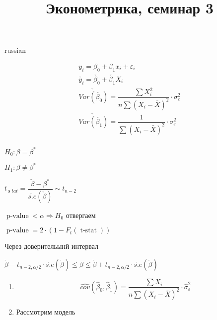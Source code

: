 \documentclass{article}
\begin{document}
\title{\foreignlanguage{russian}{Эконометрика, семинар 3}}
\maketitle
\begin{otherlanguage*}{russian}

\begin{align*}
y_i = \beta_0 + \beta_1 x_i  + \varepsilon_i \\ 
\check{y_i} = \check{\beta_0} + \check{\beta_1} X_i \\
\check{Var(\check{\beta_0})} = \dfrac{\sum X_i^2}{n \sum (X_i - \bar{X})^2} \cdot \sigma^2_{\varepsilon} \\ 
\check{Var(\check{\beta_1})} = \dfrac{1}{\sum (X_i - \bar{X})^2} \cdot \sigma^2_{\varepsilon} \\ 
\end{align*}

$ H_0: \beta = \beta^ * $ 

$ H_1: \beta \ne \beta^* $

$ t_{\operatorname stat} = \dfrac{\check{\beta} - \beta^*}{\check{s.e} (\check{\beta})} \sim t_{n-2} $

$ \operatorname{p-value} < \alpha \Rightarrow H_0 $ отвергаем

$ \operatorname{p-value} = 2 \cdot (1 - F_t (\operatorname{t-stat})) $

Через доверительынй интервал

$ \check{\beta} - t_{n-2, \alpha / 2} \cdot \check{s.e} (\check{\beta}) \le \beta \le \check{\beta} + t_{n-2, \alpha/2} \cdot \check{s.e} (\check{\beta}) $ 
\begin{enumerate}
\item 

$$ \widehat{cov} (\hat \beta_0, \hat \beta_1) = \dfrac{\sum X_i}{n \sum (X_i - \bar X )^2} \cdot \hat \sigma^2_{\varepsilon} $$

\item Рассмотрим модель 


\end{enumerate}
\end{otherlanguage*}
\end{document}
